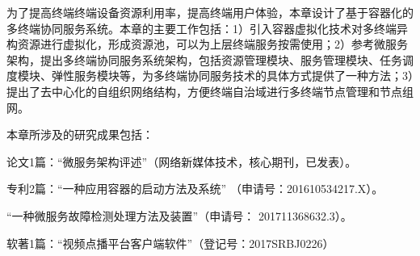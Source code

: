 为了提高终端终端设备资源利用率，提高终端用户体验，本章设计了基于容器化的多终端协同服务系统。本章的主要工作包括：1）引入容器虚拟化技术对多终端异构资源进行虚拟化，形成资源池，可以为上层终端服务按需使用；2）参考微服务架构，提出多终端协同服务系统架构，包括资源管理模块、服务管理模块、任务调度模块、弹性服务模块等，为多终端协同服务技术的具体方式提供了一种方法；3）提出了去中心化的自组织网络结构，方便终端自治域进行多终端节点管理和节点组网。

本章所涉及的研究成果包括：

论文1篇：“微服务架构评述”（网络新媒体技术，核心期刊，已发表）。

专利2篇：“一种应用容器的启动方法及系统” （申请号：201610534217.X）。

“一种微服务故障检测处理方法及装置”（申请号： 201711368632.3）。

软著1篇：“视频点播平台客户端软件”（登记号：2017SRBJ0226）